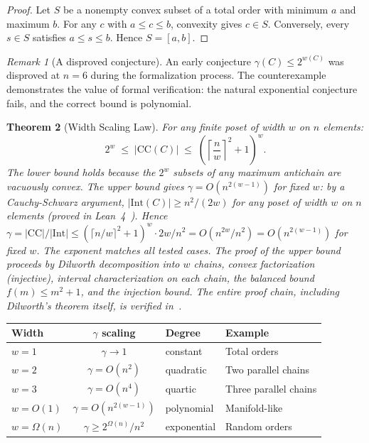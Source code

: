 \documentclass[11pt,a4paper]{article}
\theoremstyle{plain}
\newtheorem{theorem}{Theorem}[section]
\theoremstyle{definition}
\theoremstyle{remark}
\newtheorem{remark}[theorem]{Remark}
\newcommand{\CC}{\mathrm{CC}}
\newcommand{\Int}{\mathrm{Int}}
\begin{document}
\begin{proof}
Let $S$ be a nonempty convex subset of a total order with minimum $a$ and maximum $b$.
For any $c$ with $a \leq c \leq b$, convexity gives $c \in S$.
Conversely, every $s \in S$ satisfies $a \leq s \leq b$.
Hence $S = [a, b]$.
\end{proof}

\begin{remark}[A disproved conjecture]
An early conjecture $\gamma(C) \leq 2^{w(C)}$ was disproved at $n = 6$ during the formalization process.
The counterexample demonstrates the value of formal verification: the natural exponential conjecture fails, and the correct bound is polynomial.
\end{remark}

\begin{theorem}[Width Scaling Law]\label{thm:polywidth}
For any finite poset of width $w$ on $n$ elements:
\[
2^w \;\leq\; |\CC(C)| \;\leq\; \left(\left\lceil \frac{n}{w} \right\rceil^2 + 1\right)^w.
\]
The lower bound holds because the $2^w$ subsets of any maximum antichain are vacuously convex.
The upper bound gives $\gamma = O(n^{2(w-1)})$ for fixed $w$: by a Cauchy-Schwarz argument, $|\Int(C)| \geq n^2/(2w)$ for any poset of width $w$ on $n$ elements (proved in Lean~4~\cite{leanrepo}). Hence $\gamma = |\CC|/|\Int| \leq (\lceil n/w \rceil^2 + 1)^w \cdot 2w/n^2 = O(n^{2w}/n^2) = O(n^{2(w-1)})$ for fixed $w$. The exponent matches all tested cases.
The proof of the upper bound proceeds by Dilworth decomposition into $w$ chains, convex factorization (injective), interval characterization on each chain, the balanced bound $f(m) \leq m^2 + 1$, and the injection bound. The entire proof chain, including Dilworth's theorem itself, is verified in~\cite{leanrepo}.
\end{theorem}

\medskip
\begin{center}
\begin{tabular}{lcll}
\toprule
Width & $\gamma$ scaling & Degree & Example \\
\midrule
$w = 1$ & $\gamma \to 1$ & constant & Total orders \\
$w = 2$ & $\gamma = O(n^2)$ & quadratic & Two parallel chains \\
$w = 3$ & $\gamma = O(n^4)$ & quartic & Three parallel chains \\
$w = O(1)$ & $\gamma = O(n^{2(w-1)})$ & polynomial & Manifold-like \\
$w = \Omega(n)$ & $\gamma \geq 2^{\Omega(n)} / n^2$ & exponential & Random orders \\
\bottomrule
\end{tabular}
\end{center}
\medskip
\end{document}

